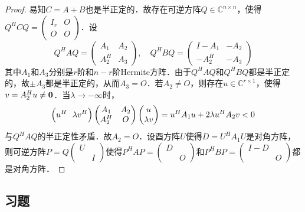 \documentclass[a4paper,fontset=windows]{ctexbook}
\theoremstyle{definition}
\begin{document}
\begin{proof}
易知$C=A+B$也是半正定的．故存在可逆方阵$Q\in\mathbb{C}^{n\times n}$，使得$Q^HCQ=\begin{pmatrix}I_r&O \\ O&O\end{pmatrix}$．设
$$Q^HAQ=\begin{pmatrix}A_1&A_2 \\ A_2^H&A_3\end{pmatrix},\quad Q^HBQ=\begin{pmatrix}I-A_1&-A_2 \\ -A_2^H&-A_3\end{pmatrix}$$
其中$A_1$和$A_3$分别是$r$阶和$n-r$阶Hermite方阵．由于$Q^HAQ$和$Q^HBQ$都是半正定的，故$\pm A_3$都是半正定的，从而$A_3=O$．若$A_2\ne O$，则存在$u\in\mathbb{C}^{r\times 1}$，使得$v=A_2^Hu\ne{\bf 0}$．当$\lambda\to-\infty$时，
$$\Bigl(u^H~~\lambda v^H\Bigr)\begin{pmatrix}A_1&A_2 \\ A_2^H&O\end{pmatrix}\begin{pmatrix}u \\ \lambda v\end{pmatrix}=u^HA_1u+2\lambda u^HA_2v<0$$
与$Q^HAQ$的半正定性矛盾．故$A_2=O$．设酉方阵$U$使得$D=U^HA_1U$是对角方阵，则可逆方阵$P=Q\begin{pmatrix}U& \\ &I\end{pmatrix}$使得$P^HAP=\begin{pmatrix}D& \\ &O\end{pmatrix}$和$P^HBP=\begin{pmatrix}I-D& \\ &O\end{pmatrix}$都是对角方阵．
\end{proof}

\subsection*{习题}
\end{document}
